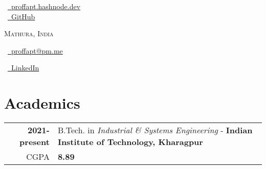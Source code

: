 \documentclass[a4paper,10pt]{extarticle} %
\begin{document}
\pagestyle{empty} %

\begin{multicols}{3}

\normalsize  \faGlobe\ {\href{https://proffapt.hashnode.dev/}{\  proffapt.hashnode.dev}}\\
\normalsize \faGithub\ {\href{https://github.com/proffapt}{\  GitHub}}\\
\columnbreak
\normalsize\par{\centering{\huge\textsc{\textcolor{primary}{Arpit Bhardwaj}}}\par} 
\par{\centering\normalsize {\textsc{Mathura, India}}\hfill\par}
\columnbreak
\raggedright\hfill\normalsize \faEnvelope\ {\href{mailto:proffapt@pm.me}{\  proffapt@pm.me}}\\
\raggedright\hfill\normalsize \faLinkedinSquare\ {\href{https://www.linkedin.com/in/proffapt}{\  LinkedIn}}\\
\end{multicols}
\vspace{-0.4 cm}

\section{\textcolor{primary}{Academics}}
\vspace{+0.1cm}

\begin{tabular}{r|p{17.5cm}}	

 \textbf{2021-present} & B.Tech. in \textit{Industrial \& Systems Engineering} - \textbf{Indian Institute of Technology, Kharagpur}\\
 \hfill CGPA & \textbf{8.89}\\

 
\end{tabular}
\end{document}

